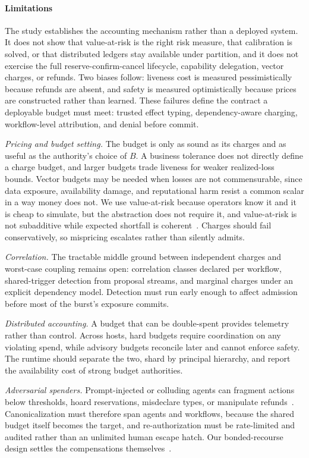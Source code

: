 \documentclass[sigconf]{acmart}
\begin{document}
\paragraph{Limitations} The study establishes the accounting mechanism rather than a deployed system. It does not show that value-at-risk is the right risk measure, that calibration is solved, or that distributed ledgers stay available under partition, and it does not exercise the full reserve-confirm-cancel lifecycle, capability delegation, vector charges, or refunds. Two biases follow: liveness cost is measured pessimistically because refunds are absent, and safety is measured optimistically because prices are constructed rather than learned. These failures define the contract a deployable budget must meet: trusted effect typing, dependency-aware charging, workflow-level attribution, and denial before commit.

\emph{Pricing and budget setting.} The budget is only as sound as its charges and as useful as the authority's choice of $B$. A business tolerance does not directly define a charge budget, and larger budgets trade liveness for weaker realized-loss bounds. Vector budgets may be needed when losses are not commensurable, since data exposure, availability damage, and reputational harm resist a common scalar in a way money does not. We use value-at-risk because operators know it and it is cheap to simulate, but the abstraction does not require it, and value-at-risk is not subadditive while expected shortfall is coherent~\cite{Artzner1999Coherent}. Charges should fail conservatively, so mispricing escalates rather than silently admits.

\emph{Correlation.} The tractable middle ground between independent charges and worst-case coupling remains open: correlation classes declared per workflow, shared-trigger detection from proposal streams, and marginal charges under an explicit dependency model. Detection must run early enough to affect admission before most of the burst's exposure commits.

\emph{Distributed accounting.} A budget that can be double-spent provides telemetry rather than control. Across hosts, hard budgets require coordination on any violating spend, while advisory budgets reconcile later and cannot enforce safety. The runtime should separate the two, shard by principal hierarchy, and report the availability cost of strong budget authorities.

\emph{Adversarial spenders.} Prompt-injected or colluding agents can fragment actions below thresholds, hoard reservations, misdeclare types, or manipulate refunds~\cite{Debenedetti2024AgentDojo,OWASP2025AgenticThreats}. Canonicalization must therefore span agents and workflows, because the shared budget itself becomes the target, and re-authorization must be rate-limited and audited rather than an unlimited human escape hatch. Our bonded-recourse design settles the compensations themselves~\cite{Bindschaedler2026Recourse}.
\end{document}
